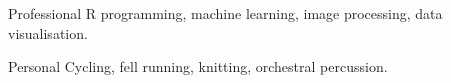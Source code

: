 
\begin{cvskills}
  \cvskill
    {Professional} %
    {R programming, machine learning, image processing, data visualisation.} %

  \cvskill
    {Personal} %
    {Cycling, fell running, knitting, orchestral percussion.} %
\end{cvskills}